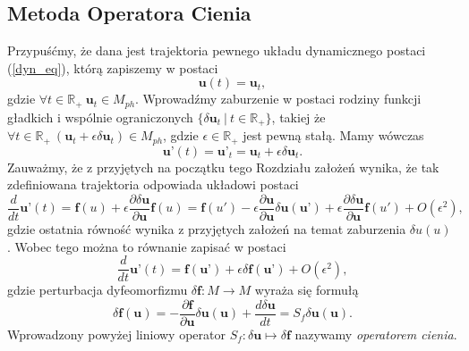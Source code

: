 \documentclass[12pt]{article}
\begin{document}
\subsection{Metoda Operatora Cienia}
Przypuśćmy, że dana jest trajektoria pewnego układu dynamicznego postaci (\ref{dyn_eq}), którą zapiszemy w postaci
\begin{equation}
\textbf{u}(t) = \textbf{u}_t,
\label{trajectory}
\end{equation}
gdzie $ \forall t \in \mathbb{R}_{+} \ \textbf{u}_t \in M_{ph}$. Wprowadźmy zaburzenie w postaci rodziny funkcji gładkich i wspólnie ograniczonych $ \{ \delta \textbf{u}_{t} \ |\ t\in \mathbb{R}_{+}\} $, takiej że $ \forall t \in \mathbb{R}_{+} \ (\textbf{u}_t + \epsilon \delta \textbf{u}_{t}) \in M_{ph}$, gdzie $ \epsilon \in \mathbb{R}_{+} $ jest pewną stałą. Mamy wówczas
\begin{equation}
\textbf{u'}(t) = \textbf{u'}_t = \textbf{u}_t + \epsilon \delta \textbf{u}_{t}.
\label{trajectory_pert}
\end{equation}
Zauważmy, że z przyjętych na początku tego Rozdziału założeń wynika, że tak zdefiniowana trajektoria odpowiada układowi postaci
\begin{equation}
\frac{d}{dt}\textbf{u'}(t) = \textbf{f}(u) + \epsilon \frac{\partial \delta \textbf{u}}{\partial \textbf{u}}\textbf{f}(u) = \textbf{f}(u') - \epsilon \frac{\partial \textbf{u}}{\partial \textbf{u}}\delta\textbf{u}(\textbf{u'}) + \epsilon \frac{\partial \delta \textbf{u}}{\partial \textbf{u}}\textbf{f}(u') + O(\epsilon^2),
\label{u_perturb}
\end{equation} 
gdzie ostatnia równość wynika z przyjętych założeń na temat zaburzenia $ \delta u(u) $ \cite{Qiqi1}. Wobec tego można to równanie zapisać w postaci
\begin{equation}
\frac{d}{dt}\textbf{u'}(t) = \textbf{f}(\textbf{u'}) + \epsilon \delta \textbf{f}(\textbf{u'}) + O(\epsilon^2),
\label{dyn_eq_pert}
\end{equation}
gdzie perturbacja dyfeomorfizmu $ \delta \textbf{f}: M \rightarrow M $ wyraża się formułą
\begin{equation}
\delta \textbf{f}(\textbf{u}) = -\frac{\partial  \textbf{f}}{\partial \textbf{u}} \delta \textbf{u}(\textbf{u}) +   \frac{d \delta \textbf{u}}{dt} = S_{f} \delta \textbf{u}(\textbf{u}).
\label{funct_pert}
\end{equation}
Wprowadzony powyżej liniowy operator $ S_{f}: \delta \textbf{u} \mapsto \delta \textbf{f} $ nazywamy \textit{operatorem cienia}.\newline
\end{document}
